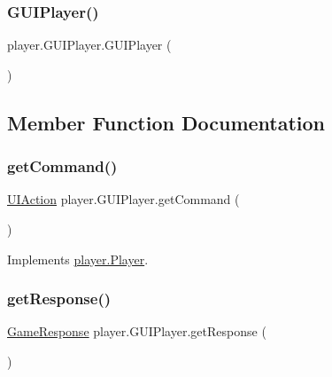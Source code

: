 \subsubsection{\texorpdfstring{G\+U\+I\+Player()}{GUIPlayer()}}
{\footnotesize\ttfamily player.\+G\+U\+I\+Player.\+G\+U\+I\+Player (\begin{DoxyParamCaption}{ }\end{DoxyParamCaption})\hspace{0.3cm}{\ttfamily [inline]}}



\subsection{Member Function Documentation}
\mbox{\label{classplayer_1_1_g_u_i_player_a21dfc86265d20c079e048c9cd725eccf}} 
\subsubsection{\texorpdfstring{get\+Command()}{getCommand()}}
{\footnotesize\ttfamily \mbox{\hyperlink{classui_1_1_u_i_action}{U\+I\+Action}} player.\+G\+U\+I\+Player.\+get\+Command (\begin{DoxyParamCaption}{ }\end{DoxyParamCaption})\hspace{0.3cm}{\ttfamily [inline]}}



Implements \mbox{\hyperlink{interfaceplayer_1_1_player_a5ee58794f4ad8b342a3f1fcb87623c6d}{player.\+Player}}.

\mbox{\label{classplayer_1_1_g_u_i_player_afa272be2d785f44914b4529ebdf88bd9}} 
\subsubsection{\texorpdfstring{get\+Response()}{getResponse()}}
{\footnotesize\ttfamily \mbox{\hyperlink{classui_1_1_game_response}{Game\+Response}} player.\+G\+U\+I\+Player.\+get\+Response (\begin{DoxyParamCaption}{ }\end{DoxyParamCaption})\hspace{0.3cm}{\ttfamily [inline]}}



